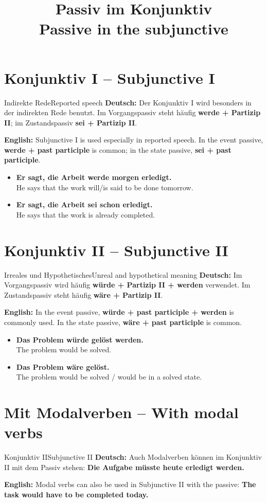 \documentclass[a4paper,11pt]{article}
\title{Passiv im Konjunktiv\\[0.3em]\large\textnormal{Passive in the subjunctive}}
\date{}
\newcommand{\GermanText}[1]{\textbf{Deutsch: }#1\par}
\newcommand{\EnglishText}[1]{{\small\color{SoftGray}\textbf{English: }#1\par}}
\newcommand{\ExampleItem}[2]{\item \textbf{#1}\\{\small\color{SoftGray}#2}}
\begin{document}
\maketitle
\tableofcontents
\newpage

\section{Konjunktiv I -- Subjunctive I}
\begin{grammarentry}{Indirekte Rede}{Reported speech}
\GermanText{Der Konjunktiv I wird besonders in der indirekten Rede benutzt. Im Vorgangspassiv steht häufig \textbf{werde + Partizip II}; im Zustandspassiv \textbf{sei + Partizip II}.}
\EnglishText{Subjunctive I is used especially in reported speech. In the event passive, \textbf{werde + past participle} is common; in the state passive, \textbf{sei + past participle}.}
\end{grammarentry}
\begin{exbox}\begin{itemize}
\ExampleItem{Er sagt, die Arbeit werde morgen erledigt.}{He says that the work will/is said to be done tomorrow.}
\ExampleItem{Er sagt, die Arbeit sei schon erledigt.}{He says that the work is already completed.}
\end{itemize}\end{exbox}

\section{Konjunktiv II -- Subjunctive II}
\begin{grammarentry}{Irreales und Hypothetisches}{Unreal and hypothetical meaning}
\GermanText{Im Vorgangspassiv wird häufig \textbf{würde + Partizip II + werden} verwendet. Im Zustandspassiv steht häufig \textbf{wäre + Partizip II}.}
\EnglishText{In the event passive, \textbf{würde + past participle + werden} is commonly used. In the state passive, \textbf{wäre + past participle} is common.}
\end{grammarentry}
\begin{exbox}\begin{itemize}
\ExampleItem{Das Problem würde gelöst werden.}{The problem would be solved.}
\ExampleItem{Das Problem wäre gelöst.}{The problem would be solved / would be in a solved state.}
\end{itemize}\end{exbox}

\section{Mit Modalverben -- With modal verbs}
\begin{grammarentry}{Konjunktiv II}{Subjunctive II}
\GermanText{Auch Modalverben können im Konjunktiv II mit dem Passiv stehen: \textbf{Die Aufgabe müsste heute erledigt werden.}}
\EnglishText{Modal verbs can also be used in Subjunctive II with the passive: \textbf{The task would have to be completed today.}}
\end{grammarentry}
\end{document}
